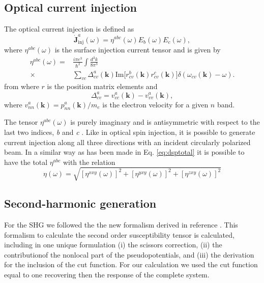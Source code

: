 \documentclass[pss]{wiley2sp} %
\begin{document}
\subsection{Optical current injection}\label{sec:theory-OCI}

The optical current injection is defined as
\begin{equation}
\mathbf{\dot{J}}^{a}_{\text{inj}}(\omega) =
\eta^{abc}(\omega)E_{b}(\omega)E_{c}(\omega), \label{eq:eta}
\end{equation}
where $\eta^{abc}(\omega)$ is the surface injection current tensor and is given by
\begin{align*}
\eta^{abc}(\omega) =& \frac{i\pi e^{3}}{\hbar^{2}}\int\frac{d^{3}k}{8\pi^{3}}
\nonumber \\
\times &
\sum_{vc}\Delta^{a}_{cv}(\mathbf{k})\text{Im}\big[r^{b}_{cv}(\mathbf{k})
r^{c}_{cv}(\mathbf{k})\big]\delta(\omega_{cv}(\mathbf{k})-\omega).
\end{align*}
from where $r$ is the position matrix elements and 
\begin{equation*}
\Delta^{a}_{cv} = v^{a}_{cc}(\mathbf{k})-v^{a}_{vv}(\mathbf{k}),
\end{equation*}
where $v^{a}_{nn}(\mathbf{k})=p^{a}_{nn}(\mathbf{k})/m_{e}$ is the electron velocity for a given $n$ band.

The tensor $\eta^{abc}(\omega)$ is purely imaginary and is antisymmetric with respect to the last two indices, \emph{b} and \emph{c} \cite{sipePRB00,nastosPRB06}. Like in optical spin injection, it is possible to generate current injection along all three directions with an incident circularly polarized beam. In a similar way as has been made in Eq. \eqref{eq:dsptotal} it is possible to have the total $\eta^{abc}$ with the relation
\begin{equation}\label{eq:etatotal}
\eta(\omega) = \sqrt{ [\eta^{xxy}(\omega)]^{2} + [\eta^{yxy}(\omega)]^{2} +[\eta^{zxy}(\omega)]^{2}}
\end{equation}

\subsection{Second-harmonic generation}\label{sec:theory-SHG}

For the SHG we followed the the new formalism derived in reference \cite{andersonPRB15}. This formalism to calculate the second order susceptibility tensor is calculated, including in one unique formulation (i) the scissors correction, (ii) the contributionof the nonlocal part of the pseudopotentials, and (iii) the derivation for the inclusion of the cut function. For our calculation we used the cut function equal to one recovering then the response of the complete system.
\end{document}
